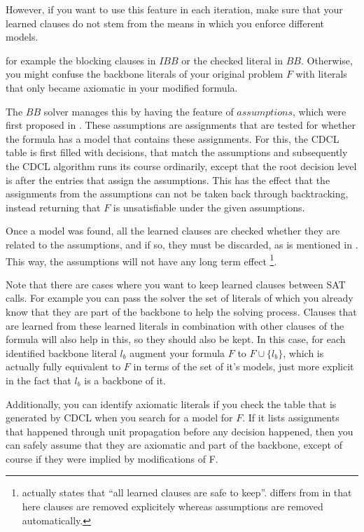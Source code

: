 
\iffalse

However, if you want to use this feature in each iteration, make sure that your learned clauses do not stem from the means in which you enforce different models.

 for example the blocking clauses in $IBB$ or the checked literal in $BB$. Otherwise, you might confuse the backbone literals of your original problem $F$ with literals that only became axiomatic in your modified formula. 

The $BB$ solver manages this by having the feature of $assumptions$, which were first proposed in \cite{ENSO03}. These assumptions are assignments that are tested for whether the formula has a model that contains these assignments. For this, the CDCL table is first filled with decisions, that match the assumptions and subsequently the CDCL algorithm runs its course ordinarily, except that the root decision level is after the entries that assign the assumptions. This has the effect that the assignments from the assumptions can not be taken back through backtracking, instead returning that $F$ is unsatisfiable under the given assumptions.

Once a model was found, all the learned clauses are checked whether they are related to the assumptions, and if so, they must be discarded, as is mentioned in \cite{WKS01}. This way, the assumptions will not have any long term effect
\footnote{\cite{ENSO03} actually states that ``all learned clauses are safe to keep''. \cite{WKS01} differs from \cite{ENSO03} in that here clauses are removed explicitely whereas assumptions are removed automatically.}.


Note that there are cases where you want to keep learned clauses between SAT calls. For example you can pass the solver the set of literals of which you already know that they are part of the backbone to help the solving process. Clauses that are learned from these learned literals in combination with other clauses of the formula will also help in this, so they should also be kept. In this case, for each identified backbone literal $l_b$ augment your formula $F$ to $F \cup \{l_b\}$, which is actually fully equivalent to $F$ in terms of the set of it's models, just more explicit in the fact that $l_b$ is a backbone of it.


Additionally, you can identify axiomatic literals if you check the table that is generated by CDCL when you search for a model for $F$. If it lists assignments that happened through unit propagation before any decision happened, then you can safely assume that they are axiomatic and part of the backbone, except of course if they were implied by modifications of F.

